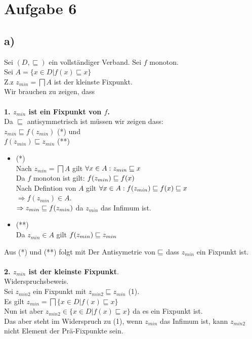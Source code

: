 \section*{Aufgabe 6}

\subsection*{a)}
Sei $(D,\sqsubseteq)$ ein vollständiger Verband. Sei $f$ monoton.\\
Sei $A = \{x \in D | f(x) \sqsubseteq x \}$\\
Z.z $z_{min} = \bigsqcap A$ ist der kleinste Fixpunkt.\\
Wir brauchen zu zeigen, dass\\\\
\textbf{1. $z_{min}$ ist ein Fixpunkt von $f$.}\\
Da $\sqsubseteq$ antisymmetrisch ist müssen wir zeigen dass:\\
$z_{min} \sqsubseteq f(z_{min}) $ (*) und \\
$f(z_{min}) \sqsubseteq z_{min}$ (**)\\
\begin{itemize}
\item (*)\\
Nach $z_{min} = \bigsqcap A$ gilt $\forall x \in A : z_{min} \sqsubseteq x$\\
Da $f$ monoton ist gilt: $f(z_{min}) \sqsubseteq f(x)$\\
Nach Defintion von $A$ gilt $\forall x \in A : f(z_{min}) \sqsubseteq f(x)  \sqsubseteq x$\\
$\Rightarrow f(z_{min}) \in A$.\\
$\Rightarrow z_{min} \sqsubseteq f(z_{min})$ da $z_{min}$ das Infimum ist.\\

\item (**)\\
Da $z_{min} \in A$ gilt $f(z_{min}) \sqsubseteq z_{min}$
\end{itemize}
Aus (*) und (**) folgt mit Der Antisymetrie von $\sqsubseteq$ dass $z_{min}$ ein Fixpunkt ist.\\\\
\textbf{2. $z_{min}$ ist der kleinste Fixpunkt}.\\
Widerspruchsbeweis.\\
Sei $z_{min2}$ ein Fixpunkt mit $z_{min2} \sqsubseteq z_{min}$ (1).\\
Es gilt $z_{min} = \bigsqcap \{x \in D | f(x) \sqsubseteq x \}$\\
Nun ist aber $z_{min2} \in \{x \in D | f(x) \sqsubseteq x \}$ da es ein Fixpunkt ist.\\
Das aber steht im Widerspruch zu (1), wenn $z_{min}$ das Infimum ist, kann $z_{min2}$ nicht Element der Prä-Fixpunkte sein.
 
